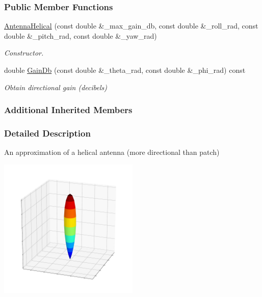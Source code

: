 \subsubsection*{Public Member Functions}
\begin{DoxyCompactItemize}
\item 
\hyperlink{classosse_1_1collaborate_1_1_antenna_helical_a2984fb54d37462763ca923c0ba5d4893}{Antenna\+Helical} (const double \&\+\_\+max\+\_\+gain\+\_\+db, const double \&\+\_\+roll\+\_\+rad, const double \&\+\_\+pitch\+\_\+rad, const double \&\+\_\+yaw\+\_\+rad)
\begin{DoxyCompactList}\small\item\em Constructor. \end{DoxyCompactList}\item 
double \hyperlink{classosse_1_1collaborate_1_1_antenna_helical_ac405a2e34ec76610b88d8f1fb407658d}{Gain\+Db} (const double \&\+\_\+theta\+\_\+rad, const double \&\+\_\+phi\+\_\+rad) const
\begin{DoxyCompactList}\small\item\em Obtain directional gain (decibels) \end{DoxyCompactList}\end{DoxyCompactItemize}
\subsubsection*{Additional Inherited Members}


\subsubsection{Detailed Description}
An approximation of a helical antenna (more directional than patch) 

 
\begin{DoxyImageNoCaption}
  \mbox{\includegraphics[width=0.5\textwidth]{helical}}
\end{DoxyImageNoCaption}


